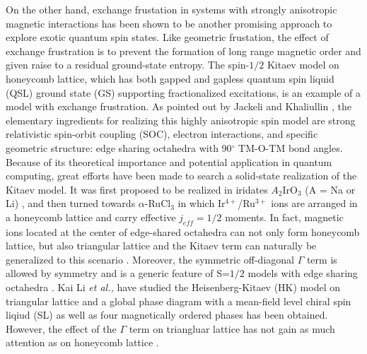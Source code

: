 \documentclass[aps,prb,reprint,groupedaddress,showpacs,amsfonts,amsmath,amssymb,superscriptaddress]{revtex4-1}
\begin{document}
On the other hand, exchange frustation in systems with strongly anisotropic magnetic interactions has been shown to be another promising approach to explore exotic quantum spin states. Like geometric frustation, the effect of exchange frustration is to prevent the formation of long range magnetic order and given raise to a residual ground-state entropy. The spin-$1/2$ Kitaev model \cite{Kitaev2006} on honeycomb lattice, which has both gapped and gapless quantum spin liquid (QSL) ground state (GS) supporting fractionalized excitations, is an example of a model with exchange frustration. As pointed out by Jackeli and Khaliullin \cite{Khaliullin2005, PhysRevLett.102.017205}, the elementary ingredients for realizing this highly anisotropic spin model are strong relativistic spin-orbit coupling (SOC), electron interactions, and specific geometric structure: edge sharing octahedra with 90$^\circ$ TM-O-TM bond angles. Because of its theoretical importance and potential application in quantum computing, great efforts have been made to search a solid-state realization of the Kitaev model. It was first proposed to be realized in iridates $A_2$IrO$_3$ (A = Na or Li) \cite{PhysRevLett.105.027204,PhysRevLett.108.127204,Chun2015,PhysRevLett.110.076402,PhysRevB.87.220407,PhysRevLett.110.097204,PhysRevLett.108.127203,PhysRevB.92.024413,PhysRevLett.112.077204,Rau2014}, and then turned towards $\alpha$-RuCl$_3$ \cite{PhysRevB.91.180401,Banerjee2016,PhysRevB.92.235119,PhysRevB.94.161106,PhysRevB.93.214431,PhysRevLett.118.107203,PhysRevLett.118.107203,PhysRevB.96.115103} in which Ir$^{4+}$/Ru$^{3+}$ ions are arranged in a honeycomb lattice and carry effective $j_{eff}=1/2$ moments. In fact, magnetic ions located at the center of edge-shared octahedra can not only form honeycomb lattice, but also triangular lattice and the Kitaev term can naturally be generalized to this scenario \cite{PhysRevB.93.104417,PhysRevB.89.014414}. Moreover, the symmetric off-diagonal $\Gamma$ term is allowed by symmetry and is a generic feature of S=$1/2$ models with edge sharing octahedra \cite {PhysRevLett.112.077204}. Kai Li \emph{et al.,} \cite{KaiLi2015} have studied the Heisenberg-Kitaev (HK) model on triangular lattice and a global phase diagram with a mean-field level chiral spin liqiud (SL) as well as four magnetically ordered phases has been obtained. However, the effect of the $\Gamma$ term on triangluar lattice has not gain as much attention as on honeycomb lattice \cite{PhysRevLett.112.077204,Rau2014,PhysRevLett.118.107203,PhysRevB.96.115103,PhysRevB.93.214431,PhysRevB.100.144422}.
\end{document}
